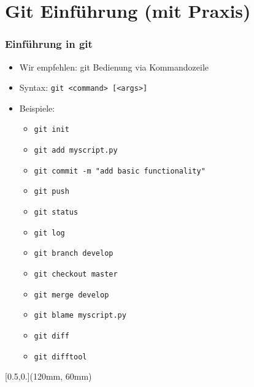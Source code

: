 \documentclass{beamer}
\begin{document}
\section{Git Einführung (mit Praxis)}
\begin{frame}[label=gitintro10]
\frametitle{Einführung in git}
\begin{itemize}
 \item Wir empfehlen: git Bedienung via Kommandozeile
 \item Syntax: \texttt{git <command> [<args>]}
 \item Beispiele:

 \begin{itemize}
  \item \texttt{git init}
  \item \texttt{git add myscript.py}
  \item \texttt{git commit -m "{}add basic functionality"}
  \item \texttt{git push}\\[2mm]
  \pause
  \item \texttt{git status}
  \item \texttt{git log}
  \item \texttt{git branch develop}
  \item \texttt{git checkout master}
  \item \texttt{git merge develop}
  \item \texttt{git blame myscript.py}
  \item \texttt{git diff}
  \item \texttt{git difftool}
  
 \end{itemize}
\end{itemize}

\begin{textblock*}{\textwidth}[0.5,0.](120mm, 60mm)
 
\end{textblock*}

\end{frame}
\end{document}
